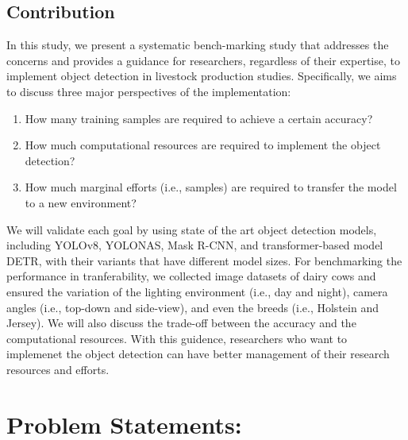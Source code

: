 \subsection{Contribution}

In this study, we present a systematic bench-marking study that addresses the concerns and provides a guidance for researchers, regardless of their expertise, to implement object detection in livestock production studies. Specifically, we aims to discuss three major perspectives of the implementation:
\begin{enumerate}
\item  How many training samples are required to achieve a certain accuracy?
\item  How much computational resources are required to implement the object detection?
\item  How much marginal efforts (i.e., samples) are required to transfer the model to a new environment?
\end{enumerate}
We will validate each goal by using state of the art object detection models, including YOLOv8, YOLONAS, Mask R-CNN, and transformer-based model DETR, with their variants that have different model sizes. For benchmarking the performance in tranferability, we collected image datasets of dairy cows and ensured the variation of the lighting environment (i.e., day and night), camera angles (i.e., top-down and side-view), and even the breeds (i.e., Holstein and Jersey). We will also discuss the trade-off between the accuracy and the computational resources. With this guidence, researchers who want to implemenet the object detection can have better management of their research resources and efforts.


\section{Problem Statements:}



